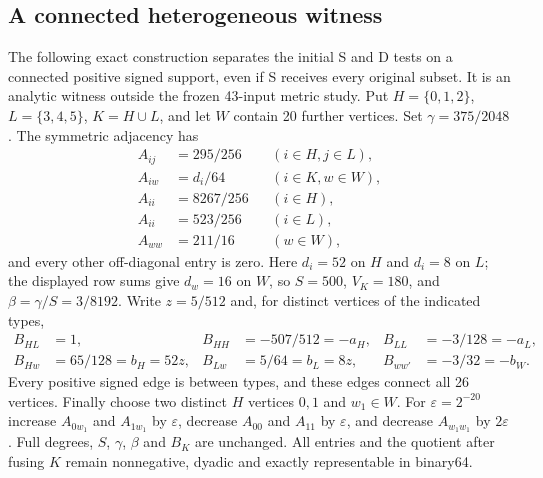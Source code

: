 \documentclass[sigconf,anonymous,review]{acmart}
\newcommand{\1}{\mathbf{1}}
\begin{document}
\subsection{A connected heterogeneous witness}\label{app:sd-connected}
The following exact construction separates the initial S and D tests on a
connected positive signed support, even if S receives every original subset.
It is an analytic witness outside the frozen 43-input metric study. Put
$H=\{0,1,2\}$, $L=\{3,4,5\}$, $K=H\cup L$, and let $W$ contain 20 further
vertices. Set $\gamma=375/2048$. The symmetric adjacency has
\begin{align*}
 A_{ij}&=295/256 &&(i\in H,j\in L),\\
 A_{iw}&=d_i/64 &&(i\in K,w\in W),\\
 A_{ii}&=8267/256 &&(i\in H),\\
 A_{ii}&=523/256 &&(i\in L),\\
 A_{ww}&=211/16 &&(w\in W),
\end{align*}
and every other off-diagonal entry is zero. Here $d_i=52$ on $H$ and
$d_i=8$ on $L$; the displayed row sums give $d_w=16$ on $W$, so
$S=500$, $V_K=180$, and $\beta=\gamma/S=3/8192$.
Write $z=5/512$ and, for distinct vertices of the indicated types,
\begin{align*}
B_{HL}&=1,& B_{HH}&=-507/512=-a_H,& B_{LL}&=-3/128=-a_L,\\
B_{Hw}&=65/128=b_H=52z,&B_{Lw}&=5/64=b_L=8z,&
B_{ww'}&=-3/32=-b_W.
\end{align*}
Every positive signed edge is between types, and these edges connect all
26 vertices. Finally choose two distinct $H$ vertices $0,1$ and $w_1\in W$.
For $\varepsilon=2^{-20}$ increase $A_{0w_1}$ and $A_{1w_1}$ by
$\varepsilon$, decrease $A_{00}$ and $A_{11}$ by $\varepsilon$, and decrease
$A_{w_1w_1}$ by $2\varepsilon$. Full degrees, $S$, $\gamma$, $\beta$ and
$B_K$ are unchanged. All entries and the quotient after fusing $K$ remain
nonnegative, dyadic and exactly representable in binary64.
\end{document}
